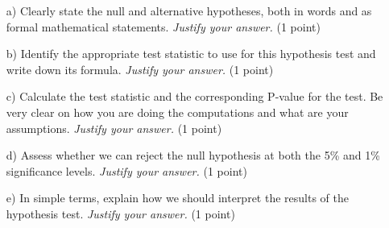 \documentclass{article}
\begin{document}
\begin{enumerate}
\item[a)] Clearly state the null and alternative hypotheses, both in words and as formal mathematical statements. \emph{Justify your answer.} (1 point)
\begin{center}
\end{center}

\item[b)] Identify the appropriate test statistic to use for this hypothesis test and write down its formula. \emph{Justify your answer.} (1 point)
\begin{center}
\end{center}

\item[c)] Calculate the test statistic and the corresponding P-value for the test. Be very clear on how you are doing the computations and what are your assumptions. \emph{Justify your answer.} (1 point)
\begin{center}
\end{center}

\item[d)] Assess whether we can reject the null hypothesis at both the 5\% and 1\% significance levels. \emph{Justify your answer.} (1 point)
\begin{center}
\end{center}

\item[e)] In simple terms, explain how we should interpret the results of the hypothesis test. \emph{Justify your answer.} (1 point)
\begin{center}
\end{center}
\end{enumerate}
\end{document}
